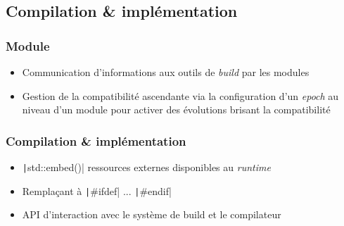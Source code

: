 \documentclass[C++.tex]{subfiles}
\begin{document}
\subsection*{Compilation \& implémentation}
\begin{frame}[fragile]
	\frametitle{Module}
	\begin{itemize}
		\item Communication d'informations aux outils de \textit{build} par les modules
		\item Gestion de la compatibilité ascendante via la configuration d'un \textit{epoch} au niveau d'un module pour activer des évolutions brisant la compatibilité

	\end{itemize}
\end{frame}

\begin{frame}[fragile]
	\frametitle{Compilation \& implémentation}
	\begin{itemize}
		\item \texttt|std::embed()| ressources externes disponibles au \textit{runtime} 


		\item Remplaçant à \texttt|#ifdef| ... \texttt|#endif|
		\item API d'interaction avec le système de build et le compilateur
	\end{itemize}
\end{frame}
\end{document}
